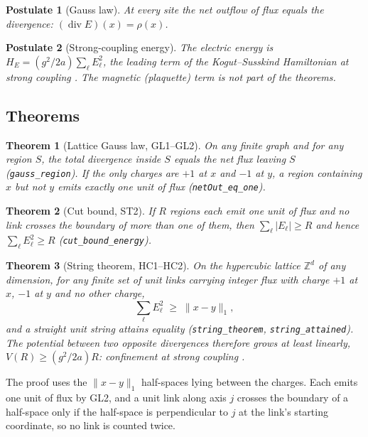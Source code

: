 \documentclass[aps,prd,preprint,superscriptaddress,amsmath,amssymb]{revtex4-2}
\newtheorem{postulate}{Postulate}[section]
\newtheorem{theorem}{Theorem}[section]
\begin{document}
\begin{postulate}[Gauss law]
\label{post:gauss}
At every site the net outflow of flux equals the divergence:
$(\operatorname{div}E)(x)=\rho(x)$.
\end{postulate}

\begin{postulate}[Strong-coupling energy]
\label{post:energy}
The electric energy is $H_E=(g^2/2a)\sum_\ell E_\ell^2$, the leading term of
the Kogut--Susskind Hamiltonian at strong coupling
\cite{kogut1975hamiltonian}.  The magnetic (plaquette) term is not part of the
theorems.
\end{postulate}

\subsection{Theorems}

\begin{theorem}[Lattice Gauss law, GL1--GL2]
On any finite graph and for any region $S$, the total divergence inside $S$
equals the net flux leaving $S$ (\texttt{gauss\_region}).  If the only
charges are $+1$ at $x$ and $-1$ at $y$, a region containing $x$ but not $y$
emits exactly one unit of flux (\texttt{netOut\_eq\_one}).
\end{theorem}

\begin{theorem}[Cut bound, ST2]
If $R$ regions each emit one unit of flux and no link crosses the boundary of
more than one of them, then $\sum_\ell|E_\ell|\ge R$ and hence
$\sum_\ell E_\ell^2\ge R$ (\texttt{cut\_bound\_energy}).
\end{theorem}

\begin{theorem}[String theorem, HC1--HC2]
On the hypercubic lattice $\mathbb{Z}^d$ of any dimension, for any finite set
of unit links carrying integer flux with charge $+1$ at $x$, $-1$ at $y$ and
no other charge,
\begin{equation}
\sum_\ell E_\ell^2\;\ge\;\|x-y\|_1 ,
\end{equation}
and a straight unit string attains equality (\texttt{string\_theorem},
\texttt{string\_attained}).  The potential between two opposite divergences
therefore grows at least linearly, $V(R)\ge(g^2/2a)R$: confinement at strong
coupling \cite{wilson1974confinement}.
\end{theorem}

The proof uses the $\|x-y\|_1$ half-spaces lying between the charges.  Each
emits one unit of flux by GL2, and a unit link along axis $j$ crosses the
boundary of a half-space only if the half-space is perpendicular to $j$ at the
link's starting coordinate, so no link is counted twice.
\end{document}
